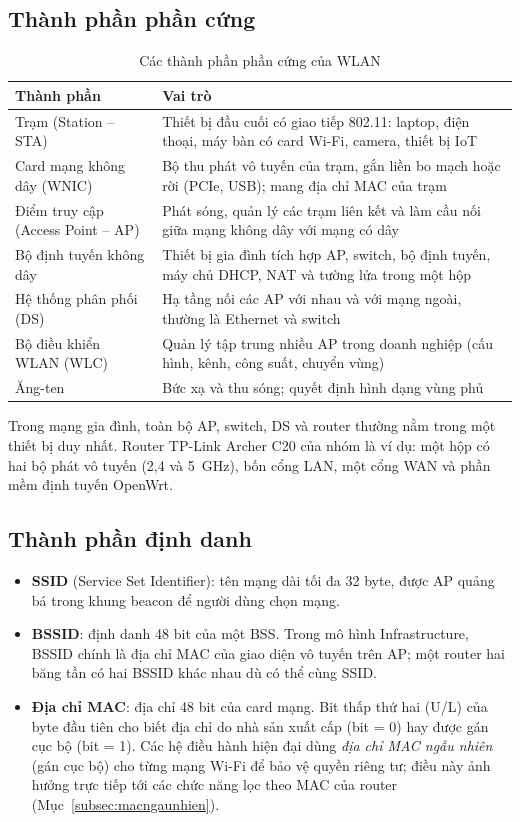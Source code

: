\documentclass[12pt,a4paper]{article}
\numberwithin{figure}{section}
\numberwithin{table}{section}
\begin{document}
\subsection{Thành phần phần cứng}
\begin{table}[H]
  \centering\small
  \caption{Các thành phần phần cứng của WLAN}
  \label{tab:thanhphan}
  \begin{tabularx}{\linewidth}{@{}P{3.8cm} L@{}}
    \toprule
    \textbf{Thành phần} & \textbf{Vai trò}\\
    \midrule
    Trạm (Station -- STA) & Thiết bị đầu cuối có giao tiếp 802.11: laptop, điện
    thoại, máy bàn có card Wi-Fi, camera, thiết bị IoT\\
    Card mạng không dây (WNIC) & Bộ thu phát vô tuyến của trạm, gắn liền bo mạch
    hoặc rời (PCIe, USB); mang địa chỉ MAC của trạm\\
    Điểm truy cập (Access Point -- AP) & Phát sóng, quản lý các trạm liên kết và
    làm cầu nối giữa mạng không dây với mạng có dây\\
    Bộ định tuyến không dây & Thiết bị gia đình tích hợp AP, switch, bộ định tuyến, máy
    chủ DHCP, NAT và tường lửa trong một hộp\\
    Hệ thống phân phối (DS) & Hạ tầng nối các AP với nhau và với mạng ngoài,
    thường là Ethernet và switch\\
    Bộ điều khiển WLAN (WLC) & Quản lý tập trung nhiều AP trong doanh nghiệp
    (cấu hình, kênh, công suất, chuyển vùng)\\
    Ăng-ten & Bức xạ và thu sóng; quyết định hình dạng vùng phủ\\
    \bottomrule
  \end{tabularx}
\end{table}

Trong mạng gia đình, toàn bộ AP, switch, DS và router thường nằm trong một
thiết bị duy nhất. Router TP-Link Archer C20 của nhóm là ví dụ: một hộp có hai
bộ phát vô tuyến (2,4 và 5~GHz), bốn cổng LAN, một cổng WAN và phần mềm định
tuyến OpenWrt.

\subsection{Thành phần định danh}
\begin{itemize}
  \item \textbf{SSID} (Service Set Identifier): tên mạng dài tối đa 32 byte,
    được AP quảng bá trong khung beacon để người dùng chọn mạng.
  \item \textbf{BSSID}: định danh 48 bit của một BSS. Trong mô hình
    Infrastructure, BSSID chính là địa chỉ MAC của giao diện vô tuyến trên AP;
    một router hai băng tần có hai BSSID khác nhau dù có thể cùng SSID.
  \item \textbf{Địa chỉ MAC}: địa chỉ 48 bit của card mạng. Bit thấp thứ hai (U/L) của
    byte đầu tiên cho biết địa chỉ do nhà sản xuất cấp (bit = 0) hay được gán
    cục bộ (bit = 1). Các hệ điều hành hiện đại dùng \emph{địa chỉ MAC ngẫu
    nhiên} (gán cục bộ) cho từng mạng Wi-Fi để bảo vệ quyền riêng tư; điều này
    ảnh hưởng trực tiếp tới các chức năng lọc theo MAC của router
    (Mục~\ref{subsec:macngaunhien}).
\end{itemize}
\end{document}
